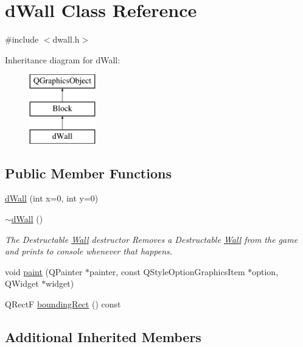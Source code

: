 \hypertarget{classd_wall}{\section{d\-Wall Class Reference}
\label{classd_wall}
}


{\ttfamily \#include $<$dwall.\-h$>$}

Inheritance diagram for d\-Wall\-:\begin{figure}[H]
\begin{center}
\leavevmode
\includegraphics[height=3.000000cm]{classd_wall}
\end{center}
\end{figure}
\subsection*{Public Member Functions}
\begin{DoxyCompactItemize}
\item 
\hyperlink{classd_wall_a09862932157c8e5f8a59b22b3222d816}{d\-Wall} (int x=0, int y=0)
\item 
\hyperlink{classd_wall_ae3e072cee7b80cf20387c3d634cb994a}{$\sim$d\-Wall} ()
\begin{DoxyCompactList}\small\item\em The Destructable \hyperlink{class_wall}{Wall} destructor Removes a Destructable \hyperlink{class_wall}{Wall} from the game and prints to console whenever that happens. \end{DoxyCompactList}\item 
void \hyperlink{classd_wall_aeaec158ea8576bfe6d40d8197ffceaf6}{paint} (Q\-Painter $\ast$painter, const Q\-Style\-Option\-Graphics\-Item $\ast$option, Q\-Widget $\ast$widget)
\item 
Q\-Rect\-F \hyperlink{classd_wall_a84d4bba890333394f10c5497379d894c}{bounding\-Rect} () const 
\end{DoxyCompactItemize}
\subsection*{Additional Inherited Members}


